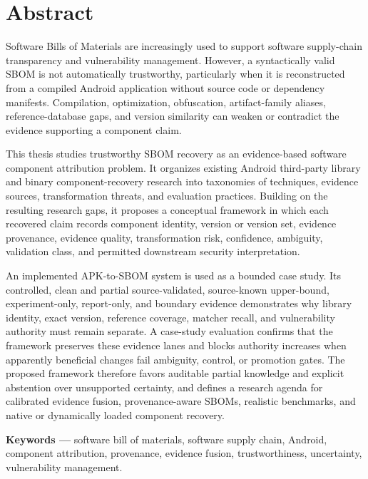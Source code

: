 \chapter*{Abstract}

Software Bills of Materials are increasingly used to support software
supply-chain transparency and vulnerability management. However, a
syntactically valid SBOM is not automatically trustworthy, particularly when
it is reconstructed
from a compiled Android application without source code or dependency
manifests. Compilation, optimization, obfuscation, artifact-family aliases,
reference-database gaps, and version similarity can weaken or contradict the
evidence supporting a component claim.

This thesis studies trustworthy SBOM recovery as an evidence-based software
component attribution problem. It organizes existing Android third-party
library and binary component-recovery research into taxonomies of techniques,
evidence sources, transformation threats, and evaluation practices. Building
on the resulting research gaps, it proposes a conceptual framework in which
each recovered claim records component identity, version or version set,
evidence provenance, evidence quality, transformation risk, confidence,
ambiguity, validation class, and permitted downstream security interpretation.

An implemented APK-to-SBOM system is used as a bounded case study. Its
controlled, clean and partial source-validated, source-known upper-bound,
experiment-only, report-only, and boundary evidence demonstrates why library
identity, exact version, reference coverage, matcher recall, and vulnerability
authority must remain separate. A case-study evaluation confirms that the
framework preserves these evidence lanes and blocks authority increases when
apparently beneficial changes fail ambiguity, control, or promotion gates.
The proposed framework therefore favors
auditable partial knowledge and explicit abstention over unsupported
certainty, and defines a research agenda for calibrated evidence fusion,
provenance-aware SBOMs, realistic benchmarks, and native or dynamically loaded
component recovery.

\vspace{0.5cm}
\noindent\textbf{Keywords ---} software bill of materials, software supply
chain, Android, component attribution, provenance, evidence fusion,
trustworthiness, uncertainty, vulnerability management.
